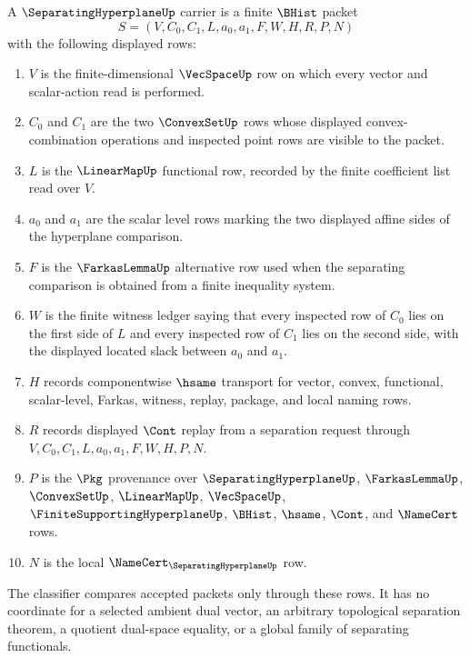 \begin{definition}
\label{def:separating-hyperplane-carrier}
A $\SeparatingHyperplaneUp$ carrier is a finite $\BHist$ packet
$$
S=(V,C_0,C_1,L,a_0,a_1,F,W,H,R,P,N)
$$
with the following displayed rows:
\begin{enumerate}
\item $V$ is the finite-dimensional $\VecSpaceUp$ row on which every vector and scalar-action read is performed.
\item $C_0$ and $C_1$ are the two $\ConvexSetUp$ rows whose displayed convex-combination operations and inspected point rows are visible to the packet.
\item $L$ is the $\LinearMapUp$ functional row, recorded by the finite coefficient list read over $V$.
\item $a_0$ and $a_1$ are the scalar level rows marking the two displayed affine sides of the hyperplane comparison.
\item $F$ is the $\FarkasLemmaUp$ alternative row used when the separating comparison is obtained from a finite inequality system.
\item $W$ is the finite witness ledger saying that every inspected row of $C_0$ lies on the first side of $L$ and every inspected row of $C_1$ lies on the second side, with the displayed located slack between $a_0$ and $a_1$.
\item $H$ records componentwise $\hsame$ transport for vector, convex, functional, scalar-level, Farkas, witness, replay, package, and local naming rows.
\item $R$ records displayed $\Cont$ replay from a separation request through $V,C_0,C_1,L,a_0,a_1,F,W,H,P,N$.
\item $P$ is the $\Pkg$ provenance over $\SeparatingHyperplaneUp$, $\FarkasLemmaUp$, $\ConvexSetUp$, $\LinearMapUp$, $\VecSpaceUp$, $\FiniteSupportingHyperplaneUp$, $\BHist$, $\hsame$, $\Cont$, and $\NameCert$ rows.
\item $N$ is the local $\NameCert_{\SeparatingHyperplaneUp}$ row.
\end{enumerate}
The classifier compares accepted packets only through these rows. It has no coordinate for a selected ambient dual vector, an arbitrary topological separation theorem, a quotient dual-space equality, or a global family of separating functionals.
\end{definition}

